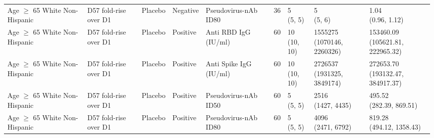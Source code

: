\documentclass[]{book}
\theoremstyle{definition}
\theoremstyle{definition}
\theoremstyle{definition}
\newcommand{\1}{\mathbbm{1}}
\begin{document}
\begin{landscape}
\begin{ThreePartTable}
\begin{longtable}[t]{>{\raggedright\arraybackslash}p{2.7cm}llllllll}
\hspace{1em}Age $\geq$ 65 White Non-Hispanic & D57 fold-rise over D1 & Placebo & Negative & Pseudovirus-nAb ID80 & 36 & \makecell[l]{5\\(5, 5)} & \makecell[l]{5\\(5, 6)} & \makecell[l]{1.04\\(0.96, 1.12)}\\
\hspace{1em}Age $\geq$ 65 White Non-Hispanic & D57 fold-rise over D1 & Placebo & Positive & Anti RBD IgG (IU/ml) & 60 & \makecell[l]{10\\(10, 10)} & \makecell[l]{1555275\\(1070146, 2260326)} & \makecell[l]{153460.09\\(105621.81, 222965.32)}\\
\hspace{1em}Age $\geq$ 65 White Non-Hispanic & D57 fold-rise over D1 & Placebo & Positive & Anti Spike IgG (IU/ml) & 60 & \makecell[l]{10\\(10, 10)} & \makecell[l]{2726537\\(1931325, 3849174)} & \makecell[l]{272653.70\\(193132.47, 384917.37)}\\
\hspace{1em}Age $\geq$ 65 White Non-Hispanic & D57 fold-rise over D1 & Placebo & Positive & Pseudovirus-nAb ID50 & 60 & \makecell[l]{5\\(5, 5)} & \makecell[l]{2516\\(1427, 4435)} & \makecell[l]{495.52\\(282.39, 869.51)}\\
\hspace{1em}Age $\geq$ 65 White Non-Hispanic & D57 fold-rise over D1 & Placebo & Positive & Pseudovirus-nAb ID80 & 60 & \makecell[l]{5\\(5, 5)} & \makecell[l]{4096\\(2471, 6792)} & \makecell[l]{819.28\\(494.12, 1358.43)}\\*
\end{longtable}
\end{ThreePartTable}


\clearpage


\end{landscape}
\end{document}
